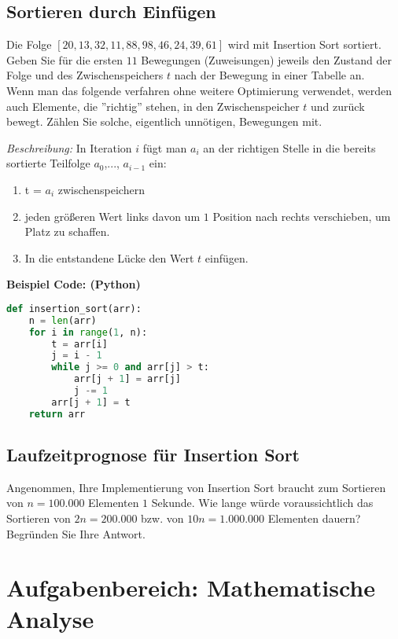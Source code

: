 \documentclass{article}
\begin{document}
\subsection{Sortieren durch Einfügen}
Die Folge $[20,13,32,11,88,98,46,24,39,61]$ wird mit Insertion Sort sortiert. Geben Sie für die ersten $11$ Bewegungen (Zuweisungen) jeweils den Zustand der Folge und des Zwischenspeichers $t$ nach der Bewegung in einer Tabelle an.\vspace{0.5em}\\
Wenn man das folgende verfahren ohne weitere Optimierung verwendet, werden auch Elemente, die ''richtig'' stehen, in den Zwischenspeicher $t$ und zurück bewegt. Zählen Sie solche, eigentlich unnötigen, Bewegungen mit.\vspace{1em}
\begin{tcolorbox}[colback=blue!5!white, colframe=gray!75!black, boxrule=1mm, rounded corners]
    \textit{Beschreibung:} In Iteration $i$ fügt man $a_i$ an der richtigen Stelle in die bereits sortierte Teilfolge $a_{0}$,..., $a_{i-1}$ ein:
    \begin{enumerate}[label=\textcolor{purple}{$\arabic*)$}]
        \item t = $a_{i}$ zwischenspeichern
        \item jeden größeren Wert links davon um $1$ Position nach rechts verschieben, um Platz zu schaffen.
        \item In die entstandene Lücke den Wert $t$ einfügen.
    \end{enumerate}
\end{tcolorbox}
\textbf{Beispiel Code: (Python)}
\begin{lstlisting}[language=python]
def insertion_sort(arr):
    n = len(arr)
    for i in range(1, n):
        t = arr[i]
        j = i - 1
        while j >= 0 and arr[j] > t:
            arr[j + 1] = arr[j]
            j -= 1
        arr[j + 1] = t
    return arr
\end{lstlisting}
\subsection{Laufzeitprognose für Insertion Sort}
Angenommen, Ihre Implementierung von Insertion Sort braucht zum Sortieren von $n = 100.000$ Elementen $1$ Sekunde. Wie lange würde voraussichtlich das Sortieren von $2n = 200.000$ bzw. von $10n = 1.000.000$ Elementen dauern? \\Begründen Sie Ihre Antwort.

\newpage
\section{Aufgabenbereich: Mathematische Analyse}
\end{document}
